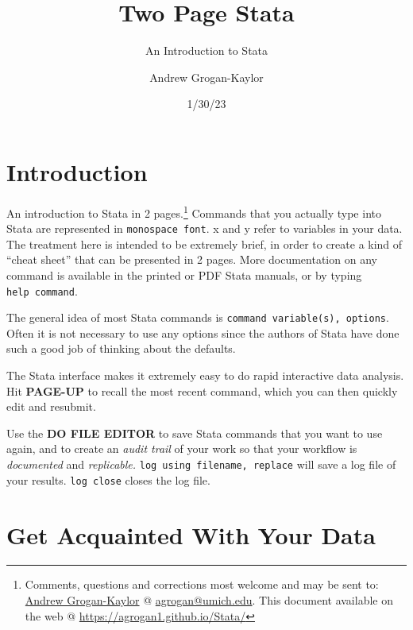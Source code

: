 \documentclass[
]{report}
\title{Two Page Stata}
\subtitle{An Introduction to Stata}
\author{Andrew Grogan-Kaylor}
\date{1/30/23}
\begin{document}
\maketitle
\ifdefined\Shaded\renewenvironment{Shaded}{\begin{tcolorbox}[interior hidden, frame hidden, enhanced, boxrule=0pt, breakable, borderline west={3pt}{0pt}{shadecolor}, sharp corners]}{\end{tcolorbox}}\fi

\hypertarget{introduction}{%
\section{Introduction}\label{introduction}}

An introduction to Stata in 2 pages.\footnote{Comments, questions and
  corrections most welcome and may be sent to:
  \href{https://agrogan1.github.io/}{Andrew Grogan-Kaylor} @
  \url{agrogan@umich.edu}. This document available on the web @
  \url{https://agrogan1.github.io/Stata/}} Commands that you actually
type into Stata are represented in \texttt{monospace\ font}. x and y
refer to variables in your data. The treatment here is intended to be
extremely brief, in order to create a kind of ``cheat sheet'' that can
be presented in 2 pages. More documentation on any command is available
in the printed or PDF Stata manuals, or by typing
\texttt{help\ command}.

The general idea of most Stata commands is
\texttt{command\ variable(s),\ options}. Often it is not necessary to
use any options since the authors of Stata have done such a good job of
thinking about the defaults.

The Stata interface makes it extremely easy to do rapid interactive data
analysis. Hit \textbf{PAGE-UP} to recall the most recent command, which
you can then quickly edit and resubmit.

Use the \textbf{DO FILE EDITOR} to save Stata commands that you want to
use again, and to create an \emph{audit trail} of your work so that your
workflow is \emph{documented} and \emph{replicable.}
\texttt{log\ using\ filename,\ replace} will save a log file of your
results. \texttt{log\ close} closes the log file.

\hypertarget{get-acquainted-with-your-data}{%
\section{Get Acquainted With Your
Data}\label{get-acquainted-with-your-data}}
\end{document}
